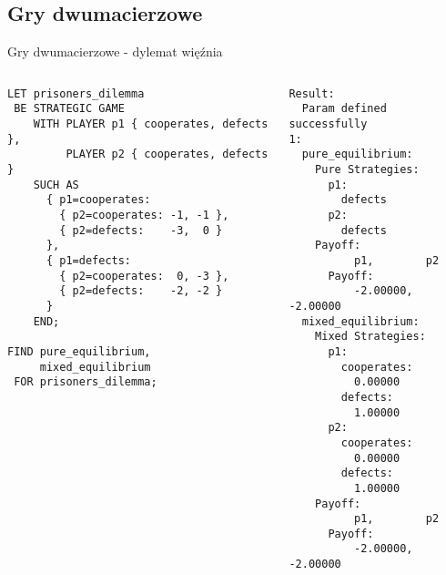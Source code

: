 \documentclass[xcolor=x11names,compress]{beamer}
\renewcommand{\(}{\begin{columns}}
\renewcommand{\)}{\end{columns}}
\newcommand{\<}[1]{\begin{column}{#1}}
\renewcommand{\>}{\end{column}}
\begin{document}
\subsection{Gry dwumacierzowe}
\begin{frame}[fragile]{Gry dwumacierzowe - dylemat więźnia}
\begin{columns}[c]
\begin{column}{.5\textwidth}
\begin{lstlisting}
LET prisoners_dilemma
 BE STRATEGIC GAME
    WITH PLAYER p1 { cooperates, defects },
         PLAYER p2 { cooperates, defects }
    SUCH AS
      { p1=cooperates:
        { p2=cooperates: -1, -1 },
        { p2=defects:    -3,  0 }
      },
      { p1=defects:
        { p2=cooperates:  0, -3 },
        { p2=defects:    -2, -2 }
      }
    END;

FIND pure_equilibrium,
     mixed_equilibrium
 FOR prisoners_dilemma;
\end{lstlisting}
\end{column}
\hspace{5pt}\vrule\hspace{5pt}
\begin{column}{.5\textwidth}
\begin{lstlisting}
Result:
  Param defined successfully
1:
  pure_equilibrium:
    Pure Strategies:
      p1:
        defects
      p2:
        defects
    Payoff:
          p1,        p2
      Payoff:
          -2.00000,  -2.00000
  mixed_equilibrium:
    Mixed Strategies:
      p1:
        cooperates:
          0.00000
        defects:
          1.00000
      p2:
        cooperates:
          0.00000
        defects:
          1.00000
    Payoff:
          p1,        p2
      Payoff:
          -2.00000,  -2.00000
\end{lstlisting}
\end{column}
\end{columns}
\end{frame}

\end{document}
